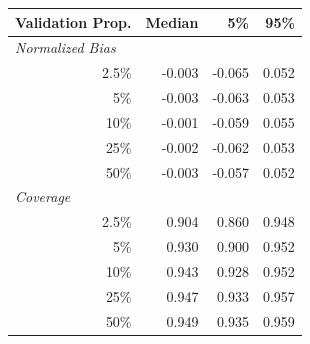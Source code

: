 
\begin{tabular}{r|rrr}
\toprule
Validation Prop. & Median & 5\% & 95\%\\
\midrule
\multicolumn{1}{l|}{\textit{Normalized Bias}}\\
2.5\% & -0.003 & -0.065 & 0.052\\
5\% & -0.003 & -0.063 & 0.053\\
10\% & -0.001 & -0.059 & 0.055\\
25\% & -0.002 & -0.062 & 0.053\\
50\% & -0.003 & -0.057 & 0.052\\
\midrule
%
\multicolumn{1}{l|}{\textit{Coverage}}\\
2.5\% & 0.904 & 0.860 & 0.948\\
5\% & 0.930 & 0.900 & 0.952\\
10\% & 0.943 & 0.928 & 0.952\\
25\% & 0.947 & 0.933 & 0.957\\
50\% & 0.949 & 0.935 & 0.959\\
\bottomrule
\end{tabular}
